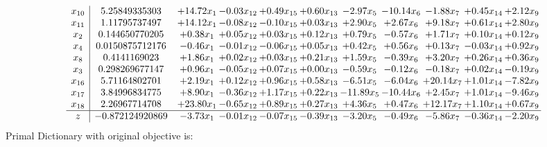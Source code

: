 \documentclass[9pt]{article}
\begin{document}
\[\begin{array}{c| c c@{\hskip 2pt} c@{\hskip 2pt} c@{\hskip 2pt} c@{\hskip 2pt} c@{\hskip 2pt} c@{\hskip 2pt} c@{\hskip 2pt} c@{\hskip 2pt} c@{\hskip 2pt} }
 x_{10}   &  5.25849335303 & + 14.72 x_{1} & -0.03 x_{12} & +  0.49 x_{15} & +  0.60 x_{13} & -2.97 x_{5} & -10.14 x_{6} & -1.88 x_{7} & +  0.45 x_{14} & +  2.12 x_{9}\\
 x_{11}   &  1.11795737497 & + 14.12 x_{1} & -0.08 x_{12} & -0.10 x_{15} & +  0.03 x_{13} & +  2.90 x_{5} & +  2.67 x_{6} & +  9.18 x_{7} & +  0.61 x_{14} & +  2.80 x_{9}\\
 x_{2}   &  0.144650770205 & +  0.38 x_{1} & +  0.05 x_{12} & +  0.03 x_{15} & +  0.12 x_{13} & +  0.79 x_{5} & -0.57 x_{6} & +  1.71 x_{7} & +  0.10 x_{14} & +  0.12 x_{9}\\
 x_{4}   &  0.0150875712176 & -0.46 x_{1} & -0.01 x_{12} & -0.06 x_{15} & +  0.05 x_{13} & +  0.42 x_{5} & +  0.56 x_{6} & +  0.13 x_{7} & -0.03 x_{14} & +  0.92 x_{9}\\
 x_{8}   &  0.4141169023 & +  1.86 x_{1} & +  0.02 x_{12} & +  0.03 x_{15} & +  0.21 x_{13} & +  1.59 x_{5} & -0.39 x_{6} & +  3.20 x_{7} & +  0.26 x_{14} & +  0.36 x_{9}\\
 x_{3}   &  0.298269677147 & +  0.96 x_{1} & -0.05 x_{12} & +  0.07 x_{15} & +  0.00 x_{13} & -0.59 x_{5} & -0.12 x_{6} & -0.18 x_{7} & +  0.02 x_{14} & -0.19 x_{9}\\
 x_{16}   &  5.71164802701 & +  2.19 x_{1} & +  0.12 x_{12} & +  0.96 x_{15} & +  0.58 x_{13} & -6.51 x_{5} & -6.04 x_{6} & + 20.14 x_{7} & +  1.01 x_{14} & -7.82 x_{9}\\
 x_{17}   &  3.84996834775 & +  8.90 x_{1} & -0.36 x_{12} & +  1.17 x_{15} & +  0.22 x_{13} & -11.89 x_{5} & -10.44 x_{6} & +  2.45 x_{7} & +  1.01 x_{14} & -9.46 x_{9}\\
 x_{18}   &  2.26967714708 & + 23.80 x_{1} & -0.65 x_{12} & +  0.89 x_{15} & +  0.27 x_{13} & +  4.36 x_{5} & +  0.47 x_{6} & + 12.17 x_{7} & +  1.10 x_{14} & +  0.67 x_{9}\\
\hline
z    &  -0.872124920869 & -3.73 x_{1} & -0.01 x_{12} & -0.07 x_{15} & -0.39 x_{13} & -3.20 x_{5} & -0.49 x_{6} & -5.86 x_{7} & -0.36 x_{14} & -2.20 x_{9}\\
\end{array}\]
Primal Dictionary with original objective is:
\end{document}
